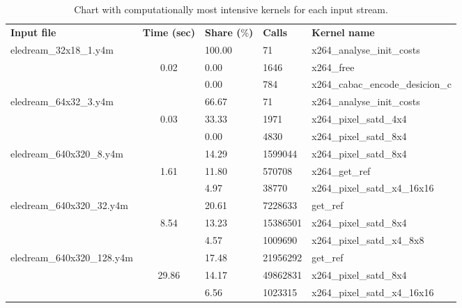 \begin{table}[htb]%
\centering
\small
	\begin{tabular}{lclll}
		\centering
		\bf{Input file} & \bf{Time (sec)} 	& \bf{Share ($\%$)} & \bf{Calls}	& \bf{Kernel name} \\ \cline{1-5}
		\multirow{3}{*}{eledream\_32x18\_1.y4m}	&				& 100.00	& 71		&	x264\_analyse\_init\_costs\\ 
																						&	0.02	& 0.00 		& 1646	&	x264\_free\\ 
																						&				& 0.00		& 784		&	x264\_cabac\_encode\_desicion\_c\\ \cline{1-5}
		\multirow{3}{*}{eledream\_64x32\_3.y4m} & 			& 66.67		& 71		& x264\_analyse\_init\_costs\\
																						&	0.03	& 33.33 	& 1971	&	x264\_pixel\_satd\_4x4\\ 
																						&				& 0.00		& 4830	&	x264\_pixel\_satd\_8x4\\ \cline{1-5}
		\multirow{3}{*}{eledream\_640x320\_8.y4m}	& 			& 14.29	& 1599044		&	x264\_pixel\_satd\_8x4\\ 
																							&	1.61	& 11.80 	& 570708	&	x264\_get\_ref\\ 
																							&				& 4.97		& 38770		&	x264\_pixel\_satd\_x4\_16x16\\ \cline{1-5}
		\multirow{3}{*}{eledream\_640x320\_32.y4m}& 			& 20.61		& 7228633		&	get\_ref\\ 
																							& 8.54	& 13.23 	& 15386501	&	x264\_pixel\_satd\_8x4\\ 
																							&				& 4.57		& 1009690		&	x264\_pixel\_satd\_x4\_8x8\\ \cline{1-5}
		\multirow{3}{*}{eledream\_640x320\_128.y4m}&			& 17.48		& 21956292	&	get\_ref\\
																							&	 29.86& 14.17 	& 49862831	&	x264\_pixel\_satd\_8x4\\
																							&				& 6.56		& 1023315		&	x264\_pixel\_satd\_x4\_16x16\\ \cline{1-5}
	\end{tabular}	
\caption{Chart with computationally most intensive kernels for each input stream.}
\label{tab:chart}
\end{table}

